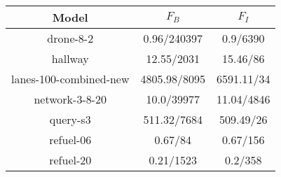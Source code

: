 \begin{table}
\begin{tabular}{|c|c|c|}
\hline

Model & $F_{B}$ & $F_{I}$ \\ \hline 

drone-8-2 & 0.96/240397 & 0.9/6390 \\
\hline
hallway & 12.55/2031 & 15.46/86 \\
\hline
lanes-100-combined-new & 4805.98/8095 & 6591.11/34 \\
\hline
network-3-8-20 & 10.0/39977 & 11.04/4846 \\
\hline
query-s3 & 511.32/7684 & 509.49/26 \\
\hline
refuel-06 & 0.67/84 & 0.67/156 \\
\hline
refuel-20 & 0.21/1523 & 0.2/358 \\
\hline
\end{tabular}
\end{table}


